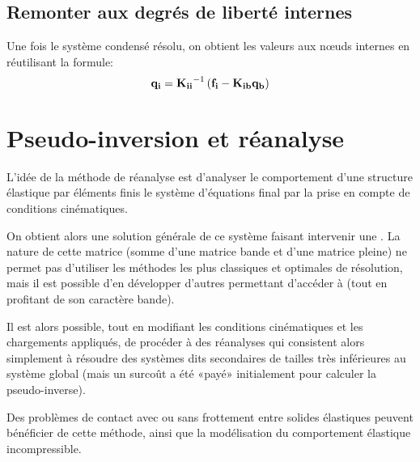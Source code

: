 \medskip
\subsection{Remonter aux degrés de liberté internes}

Une fois le système condensé résolu, on obtient les valeurs aux nœuds internes en réutilisant la formule:
\begin{equation}
\VV{q_i} = \MMI{K_{ii}}\left(\VV{f_i}-\MM{K_{ib}}\VV{q_b}\right)
\end{equation}

\medskip
\section{Pseudo-inversion et réanalyse}\label{Sec-PInv}


\medskip
L'idée de la méthode de réanalyse est d'analyser le comportement d'une structure élastique par éléments finis  le système d'équations final par la prise en compte de conditions cinématiques.

On obtient alors une solution générale de ce système faisant intervenir une . La nature de cette matrice (somme d'une matrice bande et d'une matrice pleine) ne permet pas d'utiliser les méthodes les plus classiques et optimales de résolution, mais il est possible d'en développer d'autres permettant d'accéder à  (tout en profitant de son caractère bande).

Il est alors possible, tout en modifiant les conditions cinématiques et les chargements appliqués, de procéder à des réanalyses qui consistent alors simplement à résoudre des systèmes dits secondaires de tailles très inférieures au système global (mais un surcoût a été «payé» initialement pour calculer la pseudo-inverse).

Des problèmes de contact avec ou sans frottement entre solides élastiques peuvent bénéficier de cette méthode, ainsi que la modélisation du comportement élastique incompressible.


